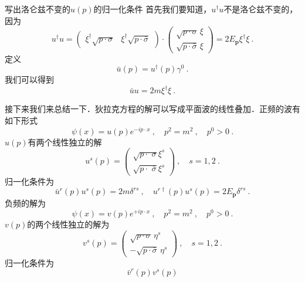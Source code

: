 \begin{exercise}{写出洛仑兹不变的$u(p)$的归一化条件}
首先我们要知道，$u^\dagger u$不是洛仑兹不变的，因为\begin{equation}
u^\dagger u = \begin{pmatrix}
\xi^\dagger \sqrt{p\cdot\sigma} & \xi^\dagger \sqrt{p\cdot\bar\sigma}
\end{pmatrix}\cdot \begin{pmatrix}
\sqrt{p\cdot\sigma} \, \xi \\ 
\sqrt{p\cdot \bar\sigma} \, \xi
\end{pmatrix} = 2 E_{\mathbf p} \xi^\dagger \xi~.
\end{equation}
定义
\begin{equation}
\bar u(p) = u^\dagger (p) \gamma^0 ~.
\end{equation}
我们可以得到
\begin{equation}
\bar u u = 2 m \xi^\dagger \xi ~.
\end{equation}
\end{exercise}
接下来我们来总结一下．狄拉克方程的解可以写成平面波的线性叠加．正频的波有如下形式
\begin{equation}
\psi(x) = u(p) e^{-ip\cdot x}~, \quad p^2 = m^2 ~, \quad p^0>0 ~.
\end{equation}
$u(p)$有两个线性独立的解
\begin{equation}
u^s(p) = \begin{pmatrix}
\sqrt{p\cdot \,\, \sigma} \xi^s \\
\sqrt{p\cdot \,\, \bar \sigma} \xi^s
\end{pmatrix}~, \quad s = 1,2~.
\end{equation}
归一化条件为
\begin{equation}
\bar u^r (p) u^s (p) = 2 m \delta^{rs} ~, \quad u^{r\dagger} (p) u^s(p) = 2 E_{\mathbf p} \delta^{rs}~.
\end{equation}
负频的解为
\begin{equation}
\psi(x) = v(p) e^{+i p \cdot x} ~, \quad p^2 = m^2 ~, \quad p^0>0~.
\end{equation}
$v(p)$的两个线性独立的解为
\begin{equation}
v^s(p)=\begin{pmatrix}
\sqrt{p\cdot\sigma} \, \eta^s\\
-\sqrt{p\cdot\bar\sigma} \, \eta^s 
\end{pmatrix}~,\quad s = 1,2~.
\end{equation}
归一化条件为
\begin{equation}
\bar v^r(p) v^s(p)
\end{equation}





